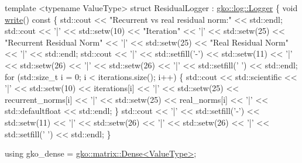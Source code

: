\begin{DoxyCodeInclude}
\textcolor{keyword}{template} <\textcolor{keyword}{typename} ValueType>
\textcolor{keyword}{struct }ResidualLogger : \hyperlink{classgko_1_1log_1_1Logger}{gko::log::Logger} \{
    \textcolor{keywordtype}{void} \hyperlink{namespacegko_a859dc47a462721d83728d91ab7fa2148}{write}()\textcolor{keyword}{ const}
\textcolor{keyword}{    }\{
        std::cout << \textcolor{stringliteral}{"Recurrent vs real residual norm:"} << std::endl;
        std::cout << \textcolor{charliteral}{'|'} << std::setw(10) << \textcolor{stringliteral}{"Iteration"} << \textcolor{charliteral}{'|'} << std::setw(25)
                  << \textcolor{stringliteral}{"Recurrent Residual Norm"} << \textcolor{charliteral}{'|'} << std::setw(25)
                  << \textcolor{stringliteral}{"Real Residual Norm"} << \textcolor{charliteral}{'|'} << std::endl;
        std::cout << \textcolor{charliteral}{'|'} << std::setfill(\textcolor{charliteral}{'-'}) << std::setw(11) << \textcolor{charliteral}{'|'}
                  << std::setw(26) << \textcolor{charliteral}{'|'} << std::setw(26) << \textcolor{charliteral}{'|'}
                  << std::setfill(\textcolor{charliteral}{' '}) << std::endl;
        \textcolor{keywordflow}{for} (std::size\_t i = 0; i < iterations.size(); i++) \{
            std::cout << std::scientific << \textcolor{charliteral}{'|'} << std::setw(10)
                      << iterations[i] << \textcolor{charliteral}{'|'} << std::setw(25)
                      << recurrent\_norms[i] << \textcolor{charliteral}{'|'} << std::setw(25)
                      << real\_norms[i] << \textcolor{charliteral}{'|'} << std::defaultfloat << std::endl;
        \}
        std::cout << \textcolor{charliteral}{'|'} << std::setfill(\textcolor{charliteral}{'-'}) << std::setw(11) << \textcolor{charliteral}{'|'}
                  << std::setw(26) << \textcolor{charliteral}{'|'} << std::setw(26) << \textcolor{charliteral}{'|'}
                  << std::setfill(\textcolor{charliteral}{' '}) << std::endl;
    \}

    \textcolor{keyword}{using} gko\_dense = \hyperlink{classgko_1_1matrix_1_1Dense}{gko::matrix::Dense<ValueType>};


\end{DoxyCodeInclude}
